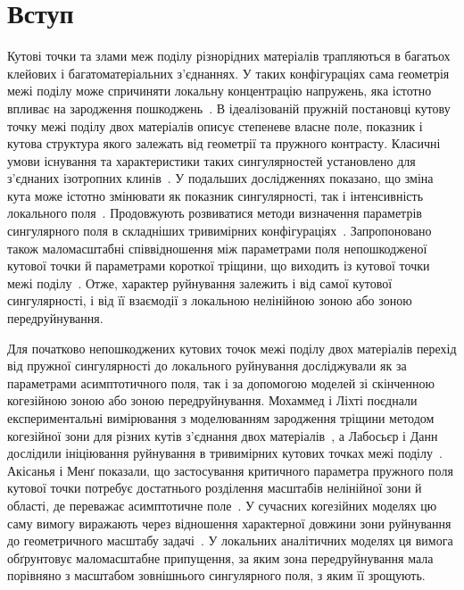 \section{Вступ}
\label{sec:introduction}

Кутові точки та злами меж поділу різнорідних матеріалів трапляються в багатьох клейових і багатоматеріальних з’єднаннях. У таких конфігураціях сама геометрія межі поділу може спричиняти локальну концентрацію напружень, яка істотно впливає на зародження пошкоджень~\citep{GacoinEtAl2009}. В ідеалізованій пружній постановці кутову точку межі поділу двох матеріалів описує степеневе власне поле, показник і кутова структура якого залежать від геометрії та пружного контрасту. Класичні умови існування та характеристики таких сингулярностей установлено для з’єднаних ізотропних клинів~\citep{BogyWang1971,DempseySinclair1981}. У подальших дослідженнях показано, що зміна кута може істотно змінювати як показник сингулярності, так і інтенсивність локального поля~\citep{MohammedLiechti2001}. Продовжують розвиватися методи визначення параметрів сингулярного поля в складніших тривимірних конфігураціях~\citep{MiyazakiFukudaNoda2025}. Запропоновано також маломасштабні співвідношення між параметрами поля непошкодженої кутової точки й параметрами короткої тріщини, що виходить із кутової точки межі поділу~\citep{LyuZhangMai2026}. Отже, характер руйнування залежить і від самої кутової сингулярності, і від її взаємодії з локальною нелінійною зоною або зоною передруйнування.

Для початково непошкоджених кутових точок межі поділу двох матеріалів перехід від пружної сингулярності до локального руйнування досліджували як за параметрами асимптотичного поля, так і за допомогою моделей зі скінченною когезійною зоною або зоною передруйнування. Мохаммед і Ліхті поєднали експериментальні вимірювання з моделюванням зародження тріщини методом когезійної зони для різних кутів з’єднання двох матеріалів~\citeyearpar{MohammedLiechti2000}, а Лабосьєр і Данн дослідили ініціювання руйнування в тривимірних кутових точках межі поділу~\citeyearpar{LabossiereDunn2001}. Акісанья і Менґ показали, що застосування критичного параметра пружного поля кутової точки потребує достатнього розділення масштабів нелінійної зони й області, де переважає асимптотичне поле~\citeyearpar{AkisanyaMeng2003}. У сучасних когезійних моделях цю саму вимогу виражають через відношення характерної довжини зони руйнування до геометричного масштабу задачі~\citep{GormanThouless2022,ThoulessGoutianos2023}. У локальних аналітичних моделях ця вимога обґрунтовує маломасштабне припущення, за яким зона передруйнування мала порівняно з масштабом зовнішнього сингулярного поля, з яким її зрощують.

